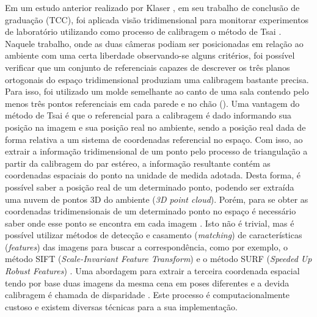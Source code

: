 Em um estudo anterior realizado por Klaser \cite{Klaser2007}, em seu trabalho
de conclusão de graduação (TCC), foi aplicada visão tridimensional para
monitorar experimentos de laboratório utilizando como processo de calibragem o
método de Tsai \cite{Tsai1987}. Naquele trabalho, onde as duas câmeras podiam
ser posicionadas em relação ao ambiente com uma certa liberdade observando-se
alguns critérios, foi possível verificar que um conjunto de referenciais capazes
de descrever os três planos ortogonais do espaço tridimensional produziam uma
calibragem bastante precisa. Para isso, foi utilizado um molde semelhante ao
canto de uma sala contendo pelo menos três pontos referenciais em cada parede e
no chão (). Uma vantagem do método de Tsai é que o referencial
para a calibragem é dado informando sua posição na imagem e sua posição real no
ambiente, sendo a posição real dada de forma relativa a um sistema de
coordenadas referencial no espaço. Com isso, ao extrair a informação
tridimensional de um ponto pelo processo de triangulação a partir da calibragem
do par estéreo, a informação resultante contém as coordenadas espaciais do ponto
na unidade de medida adotada. Desta forma, é possível saber a posição real de um
determinado ponto, podendo ser extraída uma nuvem de pontos 3D do ambiente
(\textit{3D point cloud}). Porém, para se obter as coordenadas tridimensionais
de um determinado ponto no espaço é necessário saber onde esse ponto se encontra
em cada imagem \cite{MundyZisserman1994}.
Isto não é trivial, mas é possível utilizar métodos de detecção e casamento
(\textit{matching}) de características (\textit{features}) das imagens para
buscar a correspondência, como por exemplo, o método SIFT
(\textit{Scale-Invariant Feature Transform}) \cite{Lowe1999} e o método SURF
(\textit{Speeded Up Robust Features}) \cite{Bay2008}.
Uma abordagem para extrair a terceira coordenada espacial tendo por base duas
imagens da mesma cena em poses diferentes e a devida calibragem é chamada de
disparidade \cite{Qian97binoculardisparity}. Este processo é computacionalmente
custoso e existem diversas técnicas para a sua implementação.

